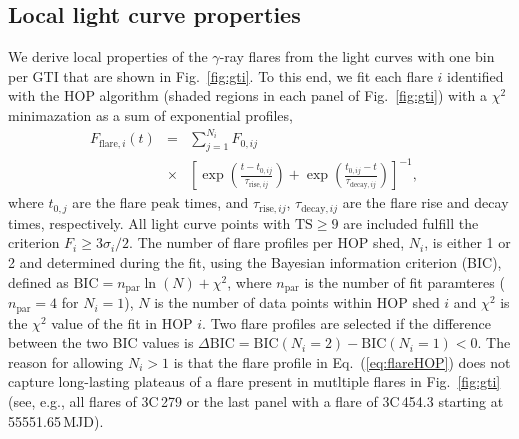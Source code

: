 \documentclass[twocolumn]{aastex62}
\newcommand{\gray}{$\gamma$-ray\xspace}
\begin{document}
\subsection{Local light curve properties}
\label{sec:hop-fit}

We derive local properties of the \gray flares from the light curves with one bin per GTI that are shown in Fig.~\ref{fig:gti}.
To this end, 
we fit each flare $i$ identified with the HOP algorithm (shaded regions in each panel of Fig.~\ref{fig:gti}) with a $\chi^2$ minimazation as a sum of exponential profiles, 
\begin{eqnarray}
    F_{\mathrm{flare},i}(t) &=& 
    \sum\limits_{j = 1}^{N_i} F_{0,ij}\nonumber\\
    &\times&\left[\exp\left(\frac{t - t_{0,ij}}{\tau_{\mathrm{rise},ij}}\right) + \exp
    \left(\frac{t_{0,ij} - t}{\tau_{\mathrm{decay},ij}}\right)\right]^{-1}\!\!\!,&
    \label{eq:flareHOP}
\end{eqnarray}
where $t_{0,j}$ are the flare peak times, and $\tau_{\mathrm{rise},ij}$, $\tau_{\mathrm{decay},ij}$ are the flare rise and decay times, respectively.
All light curve points with $\mathrm{TS}\geqslant9$ are included fulfill the criterion $F_i \geqslant 3\sigma_i/2 $.
The number of flare profiles per HOP shed, $N_i$, is either 1 or 2 and determined during the fit, using the Bayesian information criterion (BIC), defined as $\mathrm{BIC} = n_\mathrm{par}\ln(N) + \chi^2$, where $n_\mathrm{par}$ is the number of fit paramteres ($n_\mathrm{par} = 4$ for $N_i = 1$), $N$ is the number of data points within HOP shed $i$ and $\chi^2$ is the $\chi^2$ value of the fit in HOP $i$. Two flare profiles are selected if the difference between the two BIC values is $\Delta\mathrm{BIC} = \mathrm{BIC}(N_i = 2) - \mathrm{BIC}(N_i = 1) < 0$.
The reason for allowing $N_i > 1$ is that the flare profile in Eq.~(\ref{eq:flareHOP}) does not capture long-lasting plateaus of a flare present in mutltiple flares in Fig.~\ref{fig:gti} (see, e.g., all flares of 3C\,279 or the last panel with a flare of 3C\,454.3 starting at 55551.65\,MJD).
\end{document}
